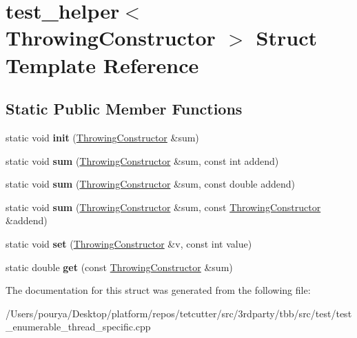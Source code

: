 \hypertarget{structtest__helper_3_01ThrowingConstructor_01_4}{}\section{test\+\_\+helper$<$ Throwing\+Constructor $>$ Struct Template Reference}
\label{structtest__helper_3_01ThrowingConstructor_01_4}
\subsection*{Static Public Member Functions}
\begin{DoxyCompactItemize}
\item 
\hypertarget{structtest__helper_3_01ThrowingConstructor_01_4_a17ad7aa1f2248eeab66f5e84b14810fe}{}static void {\bfseries init} (\hyperlink{classThrowingConstructor}{Throwing\+Constructor} \&sum)\label{structtest__helper_3_01ThrowingConstructor_01_4_a17ad7aa1f2248eeab66f5e84b14810fe}

\item 
\hypertarget{structtest__helper_3_01ThrowingConstructor_01_4_a83d5936495153474ef0e6ab5ba18afab}{}static void {\bfseries sum} (\hyperlink{classThrowingConstructor}{Throwing\+Constructor} \&sum, const int addend)\label{structtest__helper_3_01ThrowingConstructor_01_4_a83d5936495153474ef0e6ab5ba18afab}

\item 
\hypertarget{structtest__helper_3_01ThrowingConstructor_01_4_ab946f6aa8fe6475df450663340665710}{}static void {\bfseries sum} (\hyperlink{classThrowingConstructor}{Throwing\+Constructor} \&sum, const double addend)\label{structtest__helper_3_01ThrowingConstructor_01_4_ab946f6aa8fe6475df450663340665710}

\item 
\hypertarget{structtest__helper_3_01ThrowingConstructor_01_4_a57fae2730f18c91610b3c3da19dcdd38}{}static void {\bfseries sum} (\hyperlink{classThrowingConstructor}{Throwing\+Constructor} \&sum, const \hyperlink{classThrowingConstructor}{Throwing\+Constructor} \&addend)\label{structtest__helper_3_01ThrowingConstructor_01_4_a57fae2730f18c91610b3c3da19dcdd38}

\item 
\hypertarget{structtest__helper_3_01ThrowingConstructor_01_4_a09ea59e60a5dd5b47ac9ddc76be231ed}{}static void {\bfseries set} (\hyperlink{classThrowingConstructor}{Throwing\+Constructor} \&v, const int value)\label{structtest__helper_3_01ThrowingConstructor_01_4_a09ea59e60a5dd5b47ac9ddc76be231ed}

\item 
\hypertarget{structtest__helper_3_01ThrowingConstructor_01_4_a7a3294614a279ced663c4f1159ccf7e9}{}static double {\bfseries get} (const \hyperlink{classThrowingConstructor}{Throwing\+Constructor} \&sum)\label{structtest__helper_3_01ThrowingConstructor_01_4_a7a3294614a279ced663c4f1159ccf7e9}

\end{DoxyCompactItemize}


The documentation for this struct was generated from the following file\+:\begin{DoxyCompactItemize}
\item 
/\+Users/pourya/\+Desktop/platform/repos/tetcutter/src/3rdparty/tbb/src/test/test\+\_\+enumerable\+\_\+thread\+\_\+specific.\+cpp\end{DoxyCompactItemize}
